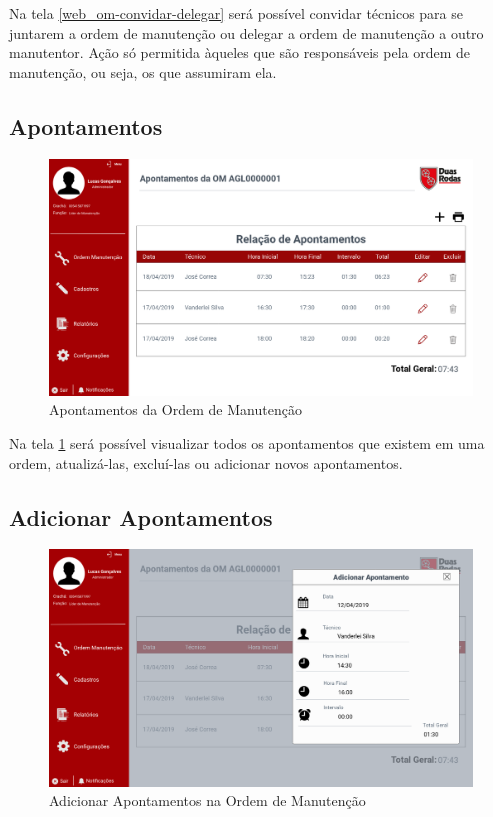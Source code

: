 Na tela \ref{web_om-convidar-delegar} será possível convidar técnicos para se juntarem a ordem de manutenção ou delegar a ordem de manutenção a outro manutentor. Ação só permitida àqueles que são responsáveis pela ordem de manutenção, ou seja, os que assumiram ela.

\newpage
\subsection{Apontamentos}

\begin{figure}[htb]
	\caption{\label{web_om-apontamentos}Apontamentos da Ordem de Manutenção}
	\begin{center}
		\includegraphics[scale=0.40]{./Figuras/web/om-apontamentos.png}
	\end{center}
\end{figure}

Na tela \ref{web_om-apontamentos} será possível visualizar todos os apontamentos que existem em uma ordem, atualizá-las, excluí-las ou adicionar novos apontamentos.

\newpage
\subsection{Adicionar Apontamentos}

\begin{figure}[htb]
	\caption{\label{web_om-add-apontamento}Adicionar Apontamentos na Ordem de Manutenção}
	\begin{center}
		\includegraphics[scale=0.40]{./Figuras/web/om-add-apontamento.png}
	\end{center}
\end{figure}

